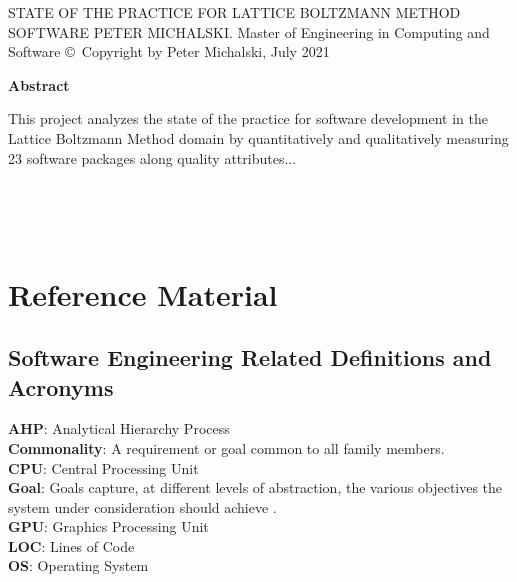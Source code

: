 \documentclass[12pt, notitlepage]{article}
\newcommand{\fulltitle}{State of the Practice for Lattice Boltzmann Method Software}
\newcommand{\authorname}{Peter Michalski}
\begin{document}
\begin{singlespace}

\thesistitle
	{\MakeUppercase{\fulltitle}}
	{\MakeUppercase{\authorname}.}
	{Master of Engineering in Computing and Software}
	{\copyright \ Copyright by \authorname, July 2021}

\newpage
\thispagestyle{empty}
\begin{center}
	\textbf{\large Abstract}
\end{center}

This project analyzes the state of the practice for software development in the Lattice Boltzmann Method domain by quantitatively and qualitatively measuring 23 software packages along quality attributes...

\newpage
{}
\tableofcontents
{}

~\newpage

\listoffigures

\listoftables

~\newpage

\clearpage
\section*{Reference Material}

\subsection*{Software Engineering Related Definitions and Acronyms}

\noindent\textbf{AHP}: Analytical Hierarchy Process\\

\noindent\textbf{Commonality}: A requirement or goal common to all family members.\\

\noindent\textbf{CPU}: Central Processing Unit\\

\noindent\textbf{Goal}: Goals capture, at different levels of abstraction, the various objectives the system under consideration should achieve \citep{van2001goal}.\\

\noindent\textbf{GPU}: Graphics Processing Unit\\

\noindent\textbf{LOC}: Lines of Code\\

\noindent\textbf{OS}: Operating System\\


\end{singlespace}
\end{document}
